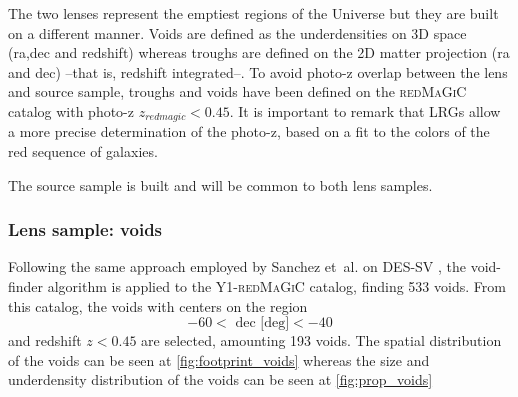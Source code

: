 The two lenses represent the emptiest regions of the Universe but they are built on a different manner. Voids are defined as the underdensities on 3D space (ra,dec and redshift) whereas troughs are defined on the 2D matter projection (ra and dec) --that is, redshift integrated--. To avoid photo-z overlap between the lens and source sample, troughs and voids have been defined on the {\scshape redMaGiC} catalog with photo-z $z_{redmagic}<0.45$. It is important to remark that LRGs allow a more precise determination of the photo-z, based on a fit to the colors of the red sequence of galaxies.
\newline

The source sample is built and will be common to both lens samples.

\subsubsection{Lens sample: voids}
Following the same approach employed by Sanchez et~al. on DES-SV \cite{2017MNRAS.465..746S}, the void-finder algorithm is applied to the Y1-{\scshape redMaGiC} catalog, finding 533 voids. From this catalog, the voids with centers on the region
\begin{equation}
-60 < \mbox{ dec [deg]} < -40
\end{equation}
and redshift $z<0.45$ are selected, amounting 193 voids. The spatial distribution of the voids can be seen at \autoref{fig:footprint_voids} whereas the size and underdensity distribution of the voids can be seen at \autoref{fig:prop_voids}

